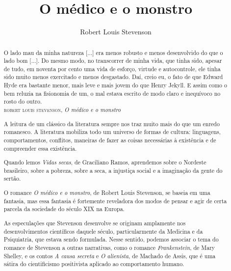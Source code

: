 \documentclass[12pt]{extarticle}
\begin{document}
\newcommand{\AutorLivro}{Robert Louis Stevenson}
\newcommand{\TituloLivro}{O médico e o monstro}
\newcommand{\Tema}{Ficção, mistério e fantasia}
\newcommand{\Genero}{Romance}
\newcommand{\issnppub}{---}
\newcommand{\issnepub}{---}
\newcommand{\colaborador}{\textbf{Fulano de Tal} é uma pessoa incrível e vai fazer um bom serviço.}


\title{\TituloLivro}
\author{\AutorLivro}
\def\authornotes{\colaborador}

\date{}
\maketitle

\begin{abstract}

\begin{flushright}
{\footnotesize
O lado mau da minha natureza {[}...{]} era menos robusto e menos
desenvolvido do que o lado bom {[}...{]}. Do mesmo modo, no transcorrer
de minha vida, que tinha sido, apesar de tudo, em noventa por cento uma
vida de esforço, virtude e autocontrole, ele tinha sido muito menos
exercitado e menos desgastado. Daí, creio eu, o fato de que Edward Hyde
era bastante menor, mais leve e mais jovem do que Henry Jekyll. E assim
como o bem reluzia na fisionomia de um, o mal estava escrito de modo
claro e inequívoco no rosto do outro.\\
\textsc{robert louis stevenson}, \emph{O médico e o monstro}
}
\end{flushright}

A leitura de um clássico da literatura sempre nos traz muito mais do que
um enredo romanesco. A literatura mobiliza todo um universo de formas de
cultura: linguagens, comportamentos, conflitos, maneiras de fazer as
coisas necessárias à existência e de compreender essa existência.

Quando lemos \emph{Vidas secas}, de Graciliano Ramos, aprendemos sobre o
Nordeste brasileiro, sobre a pobreza, sobre a seca, a injustiça social e
a imaginação da gente do sertão.

O romance \emph{O médico e o monstro}, de Robert Louis Stevenson, se
baseia em uma fantasia, mas essa fantasia é fortemente reveladora dos
modos de pensar e agir de certa parcela da sociedade do século XIX na
Europa.

As especulações que Stevenson desenvolve se originam amplamente nos
desenvolvimentos científicos daquele século, particularmente da Medicina
e da Psiquiatria, que estava sendo formulada. Nesse sentido, podemos
associar o tema do romance de Stevenson a outras narrativas, como o
romance \emph{Frankenstein}, de Mary Shelley, e os contos \emph{A causa
secreta} e \emph{O alienista}, de Machado de Assis, que é uma sátira do
cientificismo positivista aplicado ao comportamento humano.


\end{abstract}
\end{document}
